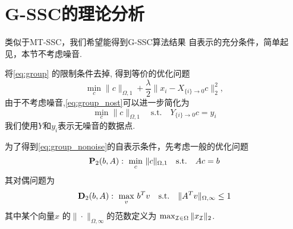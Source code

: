 \section{G-SSC的理论分析}\label{sec:proof_group}
类似于MT-SSC，我们希望能得到G-SSC算法结果
自表示的充分条件，简单起见，本节不考虑噪音.

将\eqref{eq:group} 的限制条件去掉, 得到等价的优化问题
\begin{equation} \label{eq:group_nost}
  \min_{c} \|c\|_{\Omega,1}+\frac{\lambda}{2} \|x_i-X_{\{i\}\rightarrow
0}c\|_2^2,
\end{equation}
由于不考虑噪音,\eqref{eq:group_nost}可以进一步简化为
\begin{equation} \label{eq:group_nonoise}
    \min_{c} \|c\|_{\Omega,1} \quad\text{s.t.}\quad
    Y_{\{i\}\rightarrow 0} c=y_i
\end{equation}
我们使用$Y$和$y_i$表示无噪音的数据点.

为了得到\eqref{eq:group_nonoise}的自表示条件，先考虑一般的优化问题
\[
  \mathbf{P}_2(b,A): \,\, \min_c\, \| c\|_{\Omega,1} \quad \text{s.t.}\quad Ac = b
\]
其对偶问题为 
\[
  \mathbf{D}_2(b,A): \,\, \max_{v}\, b^T v \quad
  \text{s.t.}\quad \|A^Tv\|_{\Omega,\infty} \leq 1
\]
其中某个向量$x$ 的$\|\cdot\|_{\Omega, \infty}$的范数定义为
$\max_{\mathcal{I} \in \Omega} \|x_{\mathcal{I}}\|_2$.

